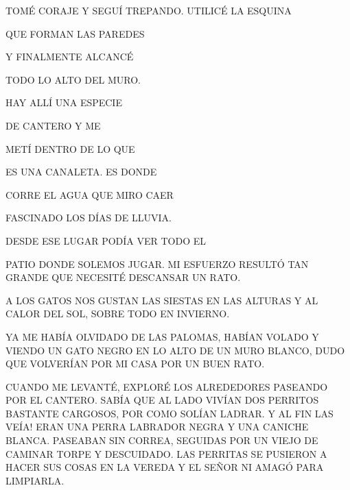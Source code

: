 \documentclass[20pt,oneside,openright,extrafontsizes,landscape,a5paper]{memoir}
\begin{document}
\newpage
{}
TOMÉ CORAJE Y SEGUÍ TREPANDO. UTILICÉ LA ESQUINA 
			
			QUE FORMAN LAS PAREDES  
			
			Y FINALMENTE ALCANCÉ
			
			 TODO LO ALTO 		DEL MURO.
			 
			  HAY ALLÍ UNA 		ESPECIE 
			  
			  DE CANTERO Y ME
			
			 METÍ DENTRO DE LO QUE
			 
			 ES  UNA CANALETA. ES DONDE
			 
			  CORRE  			 EL AGUA QUE MIRO CAER
			  
			   FASCINADO   LOS DÍAS DE LLUVIA.
			   
			    DESDE ESE LUGAR  PODÍA VER TODO EL 
			    
			    PATIO DONDE SOLEMOS JUGAR. MI ESFUERZO RESULTÓ TAN GRANDE QUE NECESITÉ DESCANSAR UN RATO.

	
	


\newpage
{}

			A LOS GATOS NOS GUSTAN LAS SIESTAS EN LAS ALTURAS Y AL CALOR DEL SOL, SOBRE TODO EN INVIERNO.
			
			YA ME HABÍA OLVIDADO DE LAS PALOMAS, HABÍAN VOLADO Y VIENDO UN GATO NEGRO EN LO ALTO DE UN MURO BLANCO, DUDO QUE VOLVERÍAN POR MI CASA POR UN BUEN RATO.
			
			CUANDO ME LEVANTÉ, EXPLORÉ LOS ALREDEDORES PASEANDO POR EL CANTERO. SABÍA QUE AL LADO VIVÍAN DOS PERRITOS BASTANTE CARGOSOS, POR COMO SOLÍAN LADRAR. Y AL FIN LAS VEÍA! ERAN UNA PERRA LABRADOR NEGRA Y UNA CANICHE BLANCA. PASEABAN SIN CORREA, SEGUIDAS POR UN VIEJO DE CAMINAR TORPE Y DESCUIDADO. LAS PERRITAS SE PUSIERON A HACER SUS COSAS  EN LA VEREDA Y EL SEÑOR NI AMAGÓ PARA LIMPIARLA.
		
		
\end{document}
